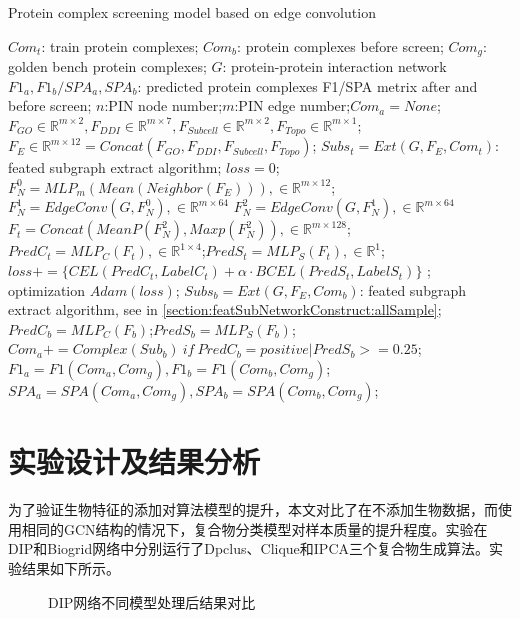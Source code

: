 \begin{algorithm}[h]
    \caption{Protein complex screening model based on edge convolution} %
    \label{alg:edgegcn-screen}
    \begin{algorithmic}[1]
        \Require
        $Com_t$: train protein complexes;
        $Com_b$: protein complexes before screen;
        $Com_g$: golden bench protein complexes;
        $G$: protein-protein interaction network
        \Ensure
        $F1_a,F1_b/SPA_a,SPA_b$: predicted protein complexes F1/SPA metrix after and before screen;
        \State $n$:PIN node number;$m$:PIN edge number;$Com_a=None$;
        \State $F_{GO}\in \mathbb{R}^{m\times 2},F_{DDI}\in \mathbb{R}^{m\times 7},F_{Subcell}\in \mathbb{R}^{m\times 2},F_{Topo}\in \mathbb{R}^{m\times 1}$;
        \State $F_{E} \in \mathbb{R}^{m\times 12}=Concat(F_{GO},F_{DDI},F_{Subcell},F_{Topo})$;
        \State $Subs_t=Ext(G,F_{E},Com_t)$: feated subgraph extract algorithm;
         $loss=0$;
        \State $F_{N}^0 =MLP_m(Mean(Neighbor(F_{E}))), \in \mathbb{R}^{m\times 12}$;
        \State $F_{N}^1=EdgeConv(G,F_{N}^0), \in \mathbb{R}^{m\times 64}$
        \State $F_{N}^2=EdgeConv(G,F_{N}^1), \in \mathbb{R}^{m\times 64}$
        \State $F_t=Concat(MeanP(F_{N}^2),Maxp(F_{N}^2)), \in \mathbb{R}^{m\times 128}$;
        \State $PredC_t=MLP_C(F_t),\in \mathbb{R}^{1\times 4}$;$PredS_t=MLP_S(F_t),\in \mathbb{R}^{1}$;
        \State $loss+=\{CEL(PredC_t,LabelC_t)+\alpha \cdot BCEL(PredS_t,LabelS_t)\}$
        \EndFor; optimization $Adam(loss)$;
        \EndFor
        \EndFor
        \State $Subs_b=Ext(G,F_{E},Com_b)$: feated subgraph extract algorithm, see in \ref{section:featSubNetworkConstruct:allSample};
         $PredC_b=MLP_C(F_b)$;$PredS_b=MLP_S(F_b)$;
        \State $Com_a+=Complex(Sub_b)~if~PredC_b=positive|PredS_b>=0.25$;
        \EndFor
        \State $F1_a=F1(Com_a,Com_g),F1_b=F1(Com_b,Com_g)$;
        \State $SPA_a=SPA(Com_a,Com_g),SPA_b=SPA(Com_b,Com_g)$;
    \end{algorithmic}
\end{algorithm}
\section{实验设计及结果分析}
\label{section:EdgeConv:experience}

为了验证生物特征的添加对算法模型的提升，本文对比了在不添加生物数据，而使用相同的GCN结构的情况下，复合物分类模型对样本质量的提升程度。实验在DIP和Biogrid网络中分别运行了Dpclus、Clique和IPCA三个复合物生成算法。实验结果如下所示。
\begin{figure}[htbp]
    \centering
    \vskip0.2cm
    \caption{DIP网络不同模型处理后结果对比}
    \label{fig:result/DIP/edge}
\end{figure}

